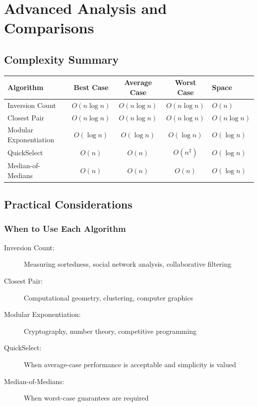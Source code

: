 \documentclass[12pt,a4paper]{article}
\begin{document}
\newpage

\section{Advanced Analysis and Comparisons}

\subsection{Complexity Summary}

\begin{center}
\renewcommand{\arraystretch}{1.6}
\begin{tabular}{|l|c|c|c|l|}
\hline
\textbf{Algorithm} & \textbf{Best Case} & \textbf{Average Case} & \textbf{Worst Case} & \textbf{Space} \\
\hline
Inversion Count & $O(n \log n)$ & $O(n \log n)$ & $O(n \log n)$ & $O(n)$ \\
Closest Pair & $O(n \log n)$ & $O(n \log n)$ & $O(n \log n)$ & $O(n \log n)$ \\
Modular Exponentiation & $O(\log n)$ & $O(\log n)$ & $O(\log n)$ & $O(\log n)$ \\
QuickSelect & $O(n)$ & $O(n)$ & $O(n^2)$ & $O(\log n)$ \\
Median-of-Medians & $O(n)$ & $O(n)$ & $O(n)$ & $O(\log n)$ \\
\hline
\end{tabular}
\end{center}

\subsection{Practical Considerations}

\subsubsection{When to Use Each Algorithm}

\begin{description}
    \item[Inversion Count:] Measuring sortedness, social network analysis, collaborative filtering
    \item[Closest Pair:] Computational geometry, clustering, computer graphics
    \item[Modular Exponentiation:] Cryptography, number theory, competitive programming
    \item[QuickSelect:] When average-case performance is acceptable and simplicity is valued
    \item[Median-of-Medians:] When worst-case guarantees are required
\end{description}
\end{document}
